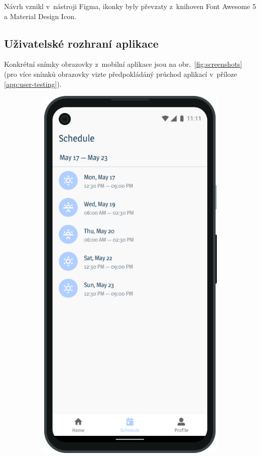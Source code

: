 \documentclass[a4paper,11pt,openany,twoside]{book}
\begin{document}
Návrh vznikl v~nástroji Figma, ikonky byly převzaty z~knihoven Font Awesome 5 a Material Design Icon.

\subsection{Uživatelské rozhraní aplikace}

Konkrétní snímky obrazovky z~mobilní aplikace jsou na obr.~\ref{fig:screenshots} (pro více snímků obrazovky vizte předpokládáný průchod aplikací v~příloze \ref{app:user-testing}).

\begin{figure}
	\centering
	\begin{subfigure}{0.34\textwidth}
				 \centering
				 \includegraphics[width=\textwidth]{img/schedule.png}

\end{subfigure}
\end{figure}
\end{document}
